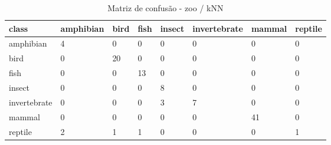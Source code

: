 \begin{table}[htbp]
\centering
\begin{tabular}{llllllll}
\hline
class & amphibian & bird & fish & insect & invertebrate & mammal & reptile \\
\hline
amphibian & 4 & 0 & 0 & 0 & 0 & 0 & 0 \\
bird & 0 & 20 & 0 & 0 & 0 & 0 & 0 \\
fish & 0 & 0 & 13 & 0 & 0 & 0 & 0 \\
insect & 0 & 0 & 0 & 8 & 0 & 0 & 0 \\
invertebrate & 0 & 0 & 0 & 3 & 7 & 0 & 0 \\
mammal & 0 & 0 & 0 & 0 & 0 & 41 & 0 \\
reptile & 2 & 1 & 1 & 0 & 0 & 0 & 1 \\
\hline
\end{tabular}
\caption{Matriz de confusão - zoo / kNN}
\label{tab:ex3-zoo-knn-cm}
\end{table}